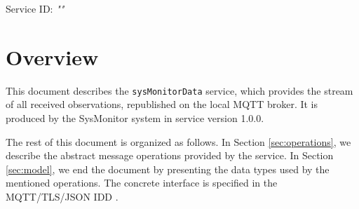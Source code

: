 \documentclass[a4paper]{arrowhead}
\begin{document}
\sloppy

\ArrowheadSetup

\begin{center}
  \vspace*{1cm}
  \huge{\arrowtitle}

  \vspace*{0.2cm}
  \LARGE{\arrowtype}
  \vspace*{1cm}

  \Large{Service ID: \textit{"\arrowid"}}

  \vspace*{\fill}


  \vspace*{1cm}
  \vspace*{\fill}

  \begin{abstract}
    This document describes the \texttt{sysMonitorData} service, version 1.0.0, produced by the SysMonitor support system of Arrowhead 5.2.2.
  \end{abstract}

  \vspace*{1cm}
\end{center}

\newpage

\tableofcontents
\newpage

\section{Overview}
\label{sec:overview}

This document describes the \texttt{sysMonitorData} service, which provides the stream of all received observations, republished on the local MQTT broker.
It is produced by the SysMonitor system \cite{smo-sysd} in service version 1.0.0.

The rest of this document is organized as follows.
In Section \ref{sec:operations}, we describe the abstract message operations provided by the service.
In Section \ref{sec:model}, we end the document by presenting the data types used by the mentioned operations.
The concrete interface is specified in the MQTT/TLS/JSON IDD \cite{smo-sysMonitorData-mqtt-idd}.
\end{document}
